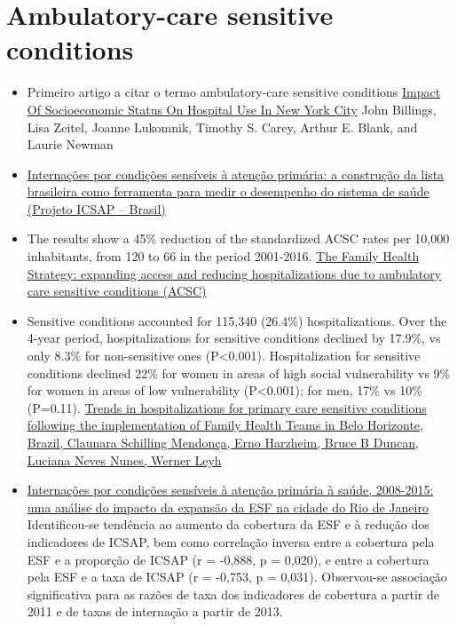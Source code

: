 \documentclass[]{book}
\begin{document}
\hypertarget{ambulatory-care-sensitive-conditions}{%
\section*{Ambulatory-care sensitive conditions}\label{ambulatory-care-sensitive-conditions}}

\begin{itemize}
\item
  Primeiro artigo a citar o termo ambulatory-care sensitive conditions \href{https://www.healthaffairs.org/doi/pdf/10.1377/hlthaff.12.1.162}{Impact Of Socioeconomic Status On Hospital Use In New York City} John Billings, Lisa Zeitel, Joanne Lukomnik, Timothy S. Carey, Arthur E. Blank, and Laurie Newman
\item
  \href{http://www.scielo.br/pdf/csp/v25n6/16.pdf}{Internações por condições sensíveis à atenção primária: a construção da lista brasileira como ferramenta para medir o desempenho do sistema de saúde (Projeto ICSAP -- Brasil)}
\item
  The results show a 45\% reduction of the standardized ACSC rates per 10,000 inhabitants, from 120 to 66 in the period 2001-2016. \href{http://www.scielo.br/pdf/csc/v23n6/en_1413-8123-csc-23-06-1903.pdf}{The Family Health Strategy: expanding access and reducing hospitalizations due to ambulatory care sensitive conditions (ACSC)}
\item
  Sensitive conditions accounted for 115,340 (26.4\%) hospitalizations. Over the 4-year period, hospitalizations for sensitive conditions declined by 17.9\%, vs only 8.3\% for non-sensitive ones (P\textless{}0.001). Hospitalization for sensitive conditions declined 22\% for women in areas of high social vulnerability vs 9\% for women in areas of low vulnerability (P\textless{}0.001); for men, 17\% vs 10\% (P=0.11). \href{https://academic.oup.com/heapol/article/27/4/348/605470}{Trends in hospitalizations for primary care sensitive conditions following the implementation of Family Health Teams in Belo Horizonte, Brazil, Claunara Schilling Mendonça, Erno Harzheim, Bruce B Duncan, Luciana Neves Nunes, Werner Leyh}
\item
  \href{http://www.scielo.br/scielo.php?script=sci_arttext\&pid=S1414-462X2018000200178\&lng=pt\&nrm=iso\&tlng=pt}{Internações por condições sensíveis à atenção primária à saúde, 2008-2015: uma análise do impacto da expansão da ESF na cidade do Rio de Janeiro}\\
  Identificou-se tendência ao aumento da cobertura da ESF e à redução dos indicadores de ICSAP, bem como correlação inversa entre a cobertura pela ESF e a proporção de ICSAP (r = -0,888, p = 0,020), e entre a cobertura pela ESF e a taxa de ICSAP (r = -0,753, p = 0,031). Observou-se associação significativa para as razões de taxa dos indicadores de cobertura a partir de 2011 e de taxas de internação a partir de 2013.\\

\end{itemize}
\end{document}
